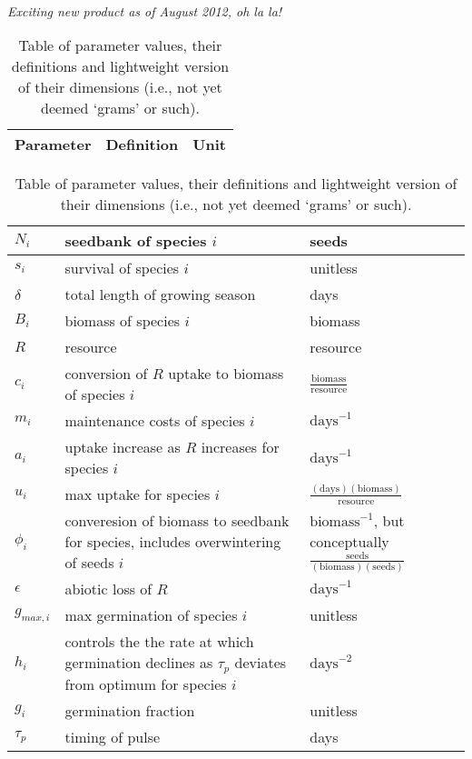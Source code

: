 \documentclass[11pt,a4paper,oneside]{article}
\begin{document}
\newpage 
{}\\
\noindent \emph{Exciting new product as of August 2012, oh la la!}
\begin{center}
\begin{table}[h!]
\caption{Table of parameter values, their definitions and lightweight version of their dimensions (i.e., not yet deemed `grams' or such).}
\begin{tabular}{ | p{3.0cm} | p{6.0cm} | p{4.0cm} |}
\hline 
Parameter & Definition & Unit \\ \hline 
\end{tabular}
\begin{tabular}{ | p{3.0cm} | p{6.0cm} | p{4.0cm} |}
\(N_{i}\) & seedbank of species \(i\) & seeds \\ \hline
\(s_{i}\) & survival of species \(i\) & unitless \\ \hline
\(\delta\) & total length of growing season & days\\ \hline
\(B_{i}\) & biomass of species \(i\) & biomass \\ \hline
\(R\) & resource & resource\\ \hline
\(c_{i}\) & conversion of \(R\) uptake to biomass of species \(i\) &  \(\frac{\text{biomass}}{\text{resource}}\) \\ \hline
\(m_{i}\) & maintenance costs of species \(i\) & \(\text{days}^{-1}\) \\ \hline
\(a_{i}\) & uptake increase as \(R\) increases for species \(i\) & \(\text{days}^{-1}\) \\ \hline
\(u_{i}\) & max uptake for species \(i\) & \(\frac{(\text{days})(\text{biomass})}{\text{resource}}\) \\ \hline
\(\phi_{i}\) & converesion of biomass to seedbank for species, includes overwintering of seeds \(i\) & \(\text{biomass}^{-1}\), but conceptually \(\frac{\text{seeds}}{(\text{biomass})(\text{seeds})}\) \\ \hline
\(\epsilon\) & abiotic loss of \(R\) &  \(\text{days}^{-1}\) \\ \hline
\(g_{max,i}\) & max germination of species \(i\) & unitless \\ \hline
\(h_{i}\) &  controls the the rate at which germination declines as \(\tau_{p}\) deviates from optimum for species \(i\)  & \(\text{days}^{-2}\) \\ \hline
\(g_{i}\) & germination fraction & unitless \\ \hline
\(\tau_{p}\) & timing of pulse & days \\ \hline

\end{tabular}
\end{table}
\end{center}
\end{document}
